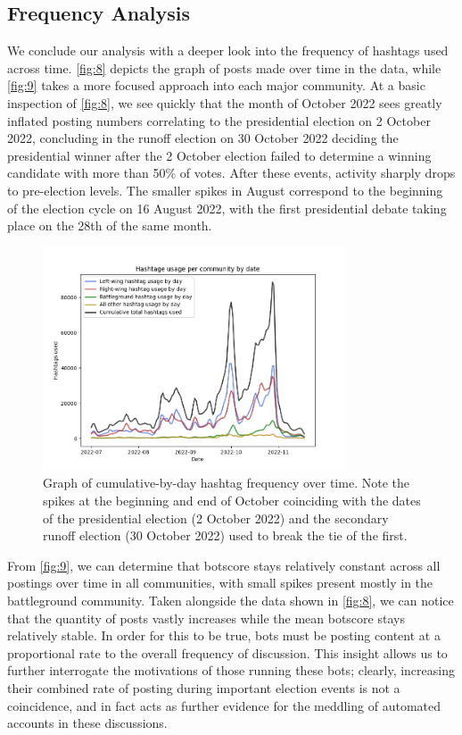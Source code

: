 \documentclass[a4paper,11pt]{article}  %
\begin{document}
	\subsection{Frequency Analysis}
	We conclude our analysis with a deeper look into the frequency of hashtags used across time. \autoref{fig:8} depicts the graph of posts made over time in the data, while \autoref{fig:9} takes a more focused approach into each major community. At a basic inspection of \autoref{fig:8}, we see quickly that the month of October 2022 sees greatly inflated posting numbers correlating to the presidential election on 2 October 2022, concluding in the runoff election on 30 October 2022 deciding the presidential winner after the 2 October election failed to determine a winning candidate with more than 50\% of votes. After these events, activity sharply drops to pre-election levels. The smaller spikes in August correspond to the beginning of the election cycle on 16 August 2022, with the first presidential debate taking place on the 28th of the same month.
	
	\begin{figure}%
		\begin{center}
			\includegraphics[width=0.8\textwidth]{images/plt_major_appearances}
		\end{center}
		\caption{Graph of cumulative-by-day hashtag frequency over time. Note the spikes at the beginning and end of October coinciding with the dates of the presidential election (2 October 2022) and the secondary runoff election (30 October 2022) used to break the tie of the first.}
		\label{fig:8}
	\end{figure}
	
	From \autoref{fig:9}, we can determine that botscore stays relatively constant across all postings over time in all communities, with small spikes present mostly in the battleground community. Taken alongside the data shown in \autoref{fig:8}, we can notice that the quantity of posts vastly increases while the mean botscore stays relatively stable. In order for this to be true, bots must be posting content at a proportional rate to the overall frequency of discussion. This insight allows us to further interrogate the motivations of those running these bots; clearly, increasing their combined rate of posting during important election events is not a coincidence, and in fact acts as further evidence for the meddling of automated accounts in these discussions. 
\end{document}
